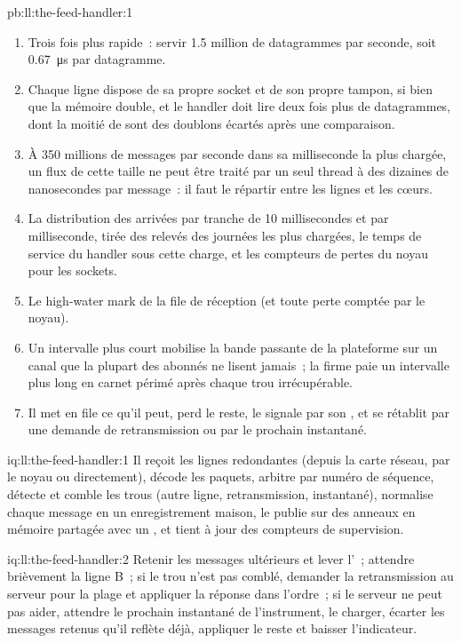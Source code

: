 \begin{solution}{pb:ll:the-feed-handler:1}
\begin{enumerate}
\item Trois fois plus rapide~: servir 1.5 million de datagrammes par seconde, soit \qty{0.67}{\micro\second} par datagramme.
\item Chaque ligne dispose de sa propre socket et de son propre tampon, si bien que la mémoire double, et le handler doit lire deux fois plus de datagrammes, dont la moitié de
sont des doublons écartés après une comparaison.
\item À 350 millions de messages par seconde dans sa milliseconde la plus chargée, un flux de cette taille ne peut être traité par un seul thread à des dizaines
de nanosecondes par message~: il faut le répartir entre les lignes et les cœurs.
\item La distribution des arrivées par tranche de 10 millisecondes et par milliseconde, tirée des relevés des journées les plus chargées, le temps de service du
handler sous cette charge, et les compteurs de pertes du noyau pour les sockets.
\item Le high-water mark de la file de réception (et toute perte comptée par le noyau).
\item Un intervalle plus court mobilise la bande passante de la plateforme sur un canal que la plupart des abonnés ne lisent jamais~; la firme paie un intervalle plus long en
carnet périmé après chaque trou irrécupérable.
\item Il met en file ce qu'il peut, perd le reste, le signale par son , et se rétablit par une demande de retransmission ou par le prochain
instantané.
\end{enumerate}
\end{solution}

\begin{solution}{iq:ll:the-feed-handler:1}
Il reçoit les lignes redondantes (depuis la carte réseau, par le noyau ou directement), décode les paquets, arbitre par
numéro de séquence, détecte et comble les trous (autre ligne, retransmission, instantané), normalise chaque message en un enregistrement
maison, le publie sur des anneaux en mémoire partagée avec un , et tient à jour des compteurs de supervision.
\end{solution}

\begin{solution}{iq:ll:the-feed-handler:2}
Retenir les messages ultérieurs et lever l'~; attendre brièvement la ligne B~; si le trou n'est pas comblé, demander la retransmission
au serveur pour la plage et appliquer la réponse dans l'ordre~; si le serveur ne peut pas aider, attendre le prochain instantané de l'instrument, le charger,
écarter les messages retenus qu'il reflète déjà, appliquer le reste et baisser l'indicateur.
\end{solution}

